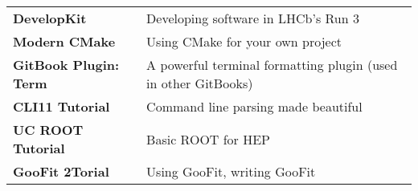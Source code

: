 \documentclass[10pt,letterpaper,english]{moderncv}
\begin{document}
\begin{tabularx}{\textwidth}{>{\bfseries}lX}
DevelopKit & Developing software in LHCb’s Run 3 \\
Modern CMake & Using CMake for your own project \\
GitBook Plugin: Term & A powerful terminal formatting plugin (used in other GitBooks) \\
CLI11 Tutorial & Command line parsing made beautiful \\
UC ROOT Tutorial & Basic ROOT for HEP \\
GooFit 2Torial & Using GooFit, writing GooFit \\
\end{tabularx}
\end{document}
